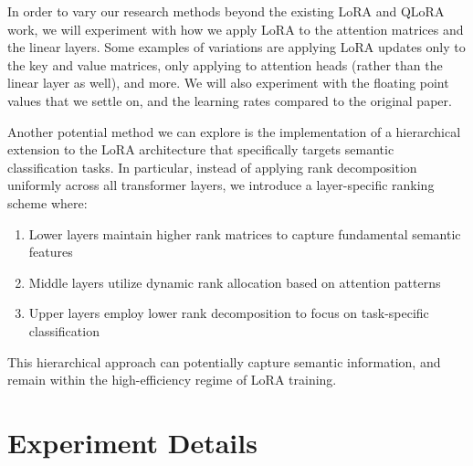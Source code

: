 \documentclass[11pt]{article}
\begin{document}
In order to vary our research methods beyond the existing LoRA and QLoRA work, we will experiment with how we apply LoRA to the attention matrices and the linear layers. Some examples of variations are applying LoRA updates only to the key and value matrices, only applying to attention heads (rather than the linear layer as well), and more. We will also experiment with the floating point values that we settle on, and the learning rates compared to the original paper. 

Another potential method we can explore is the implementation of a hierarchical extension to the LoRA architecture that specifically targets semantic classification tasks. In particular, instead of applying rank decomposition uniformly across all transformer layers, we introduce a layer-specific ranking scheme where:
\begin{enumerate}
	\item Lower layers maintain higher rank matrices to capture fundamental semantic features
	\item Middle layers utilize dynamic rank allocation based on attention patterns
	\item Upper layers employ lower rank decomposition to focus on task-specific classification
\end{enumerate}

This hierarchical approach can potentially capture semantic information, and remain within the high-efficiency regime of LoRA training.


\section{Experiment Details}
\end{document}
